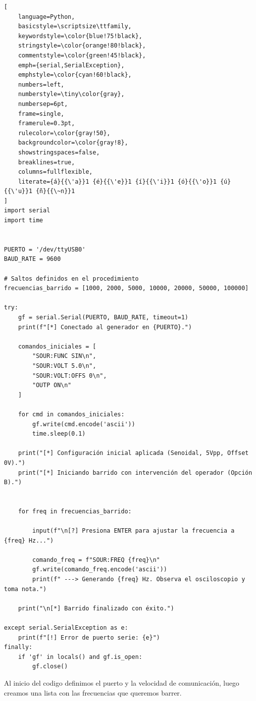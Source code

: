 \begin{lstlisting}[
    language=Python,
    basicstyle=\scriptsize\ttfamily,
    keywordstyle=\color{blue!75!black},
    stringstyle=\color{orange!80!black},
    commentstyle=\color{green!45!black},
    emph={serial,SerialException},
    emphstyle=\color{cyan!60!black},
    numbers=left,
    numberstyle=\tiny\color{gray},
    numbersep=6pt,
    frame=single,
    framerule=0.3pt,
    rulecolor=\color{gray!50},
    backgroundcolor=\color{gray!8},
    showstringspaces=false,
    breaklines=true,
    columns=fullflexible,
    literate={á}{{\'a}}1 {é}{{\'e}}1 {í}{{\'i}}1 {ó}{{\'o}}1 {ú}{{\'u}}1 {ñ}{{\~n}}1
]
import serial
import time


PUERTO = '/dev/ttyUSB0'  
BAUD_RATE = 9600

# Saltos definidos en el procedimiento
frecuencias_barrido = [1000, 2000, 5000, 10000, 20000, 50000, 100000]

try:
    gf = serial.Serial(PUERTO, BAUD_RATE, timeout=1)
    print(f"[*] Conectado al generador en {PUERTO}.")

    comandos_iniciales = [
        "SOUR:FUNC SIN\n",
        "SOUR:VOLT 5.0\n",
        "SOUR:VOLT:OFFS 0\n",
        "OUTP ON\n"
    ]
    
    for cmd in comandos_iniciales:
        gf.write(cmd.encode('ascii'))
        time.sleep(0.1)

    print("[*] Configuración inicial aplicada (Senoidal, 5Vpp, Offset 0V).")
    print("[*] Iniciando barrido con intervención del operador (Opción B).")


    for freq in frecuencias_barrido:

        input(f"\n[?] Presiona ENTER para ajustar la frecuencia a {freq} Hz...")
        
        comando_freq = f"SOUR:FREQ {freq}\n"
        gf.write(comando_freq.encode('ascii'))
        print(f" ---> Generando {freq} Hz. Observa el osciloscopio y toma nota.")

    print("\n[*] Barrido finalizado con éxito.")

except serial.SerialException as e:
    print(f"[!] Error de puerto serie: {e}")
finally:
    if 'gf' in locals() and gf.is_open:
        gf.close()
\end{lstlisting}

Al inicio del codigo definimos el puerto y la velocidad de comunicación, luego creamos una lista con las frecuencias que queremos barrer.\\

